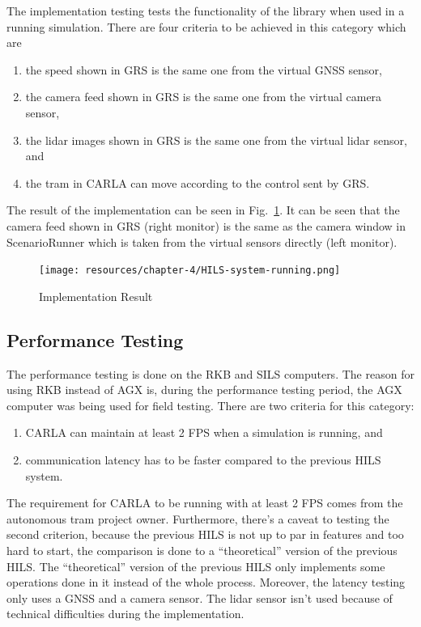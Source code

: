 The implementation testing tests the functionality of the library when used in a
running simulation. There are four criteria to be achieved in this category
which are
\begin{enumerate}
	\item the speed shown in GRS is the same one from the virtual GNSS sensor,
	\item the camera feed shown in GRS is the same one from the virtual camera
	      sensor,
	\item the lidar images shown in GRS is the same one from the virtual lidar
	      sensor, and
	\item the tram in CARLA can move according to the control sent by GRS.
\end{enumerate}

The result of the implementation can be seen in
Fig.~\ref{fig-section-6-implementation-results}. It can be seen that the camera
feed shown in GRS (right monitor) is the same as the camera window in
ScenarioRunner which is taken from the virtual sensors directly (left monitor).

\begin{figure}[htbp]
	\centerline{\texttt{[image: resources/chapter-4/HILS-system-running.png]}}
	\caption{Implementation Result}
	\label{fig-section-6-implementation-results}
\end{figure}

\subsection{Performance Testing}

The performance testing is done on the RKB and SILS computers. The reason for
using RKB instead of AGX is, during the performance testing period, the AGX
computer was being used for field testing. There are two criteria for this
category:
\begin{enumerate}
	\item CARLA can maintain at least 2 FPS when a simulation is running, and
	\item communication latency has to be faster compared to the previous HILS
	      system.
\end{enumerate}
The requirement for CARLA to be running with at least 2 FPS comes from the
autonomous tram project owner. Furthermore, there's a caveat to testing the
second criterion, because the previous HILS is not up to par in features and too
hard to start, the comparison is done to a ``theoretical'' version of the
previous HILS. The ``theoretical'' version of the previous HILS only implements
some operations done in it instead of the whole process. Moreover, the latency
testing only uses a GNSS and a camera sensor. The lidar sensor isn't used
because of technical difficulties during the implementation.

